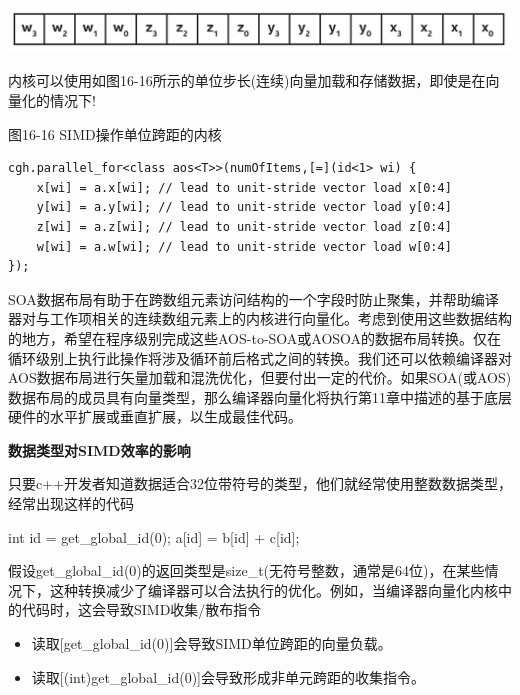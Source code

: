 \begin{center}
	\includegraphics[width=1.0\textwidth]{content/chapter-16/images/9}
\end{center}

内核可以使用如图16-16所示的单位步长(连续)向量加载和存储数据，即使是在向量化的情况下!

\hspace*{\fill} \par %
图16-16 SIMD操作单位跨距的内核
\begin{lstlisting}[caption={}]
cgh.parallel_for<class aos<T>>(numOfItems,[=](id<1> wi) {
	x[wi] = a.x[wi]; // lead to unit-stride vector load x[0:4]
	y[wi] = a.y[wi]; // lead to unit-stride vector load y[0:4]
	z[wi] = a.z[wi]; // lead to unit-stride vector load z[0:4]
	w[wi] = a.w[wi]; // lead to unit-stride vector load w[0:4]
});
\end{lstlisting}

SOA数据布局有助于在跨数组元素访问结构的一个字段时防止聚集，并帮助编译器对与工作项相关的连续数组元素上的内核进行向量化。考虑到使用这些数据结构的地方，希望在程序级别完成这些AOS-to-SOA或AOSOA的数据布局转换。仅在循环级别上执行此操作将涉及循环前后格式之间的转换。我们还可以依赖编译器对AOS数据布局进行矢量加载和混洗优化，但要付出一定的代价。如果SOA(或AOS)数据布局的成员具有向量类型，那么编译器向量化将执行第11章中描述的基于底层硬件的水平扩展或垂直扩展，以生成最佳代码。\par

\hspace*{\fill} \par %
\textbf{数据类型对SIMD效率的影响}

只要c++开发者知道数据适合32位带符号的类型，他们就经常使用整数数据类型，经常出现这样的代码\par

\begin{tcolorbox}[colback=white,colframe=black]
int id = get\_global\_id(0); a[id] = b[id] + c[id];
\end{tcolorbox}

假设get\_global\_id(0)的返回类型是size\_t(无符号整数，通常是64位)，在某些情况下，这种转换减少了编译器可以合法执行的优化。例如，当编译器向量化内核中的代码时，这会导致SIMD收集/散布指令

\begin{itemize}
	\item 读取[get\_global\_id(0)]会导致SIMD单位跨距的向量负载。
	\item 读取[(int)get\_global\_id(0)]会导致形成非单元跨距的收集指令。
\end{itemize}


